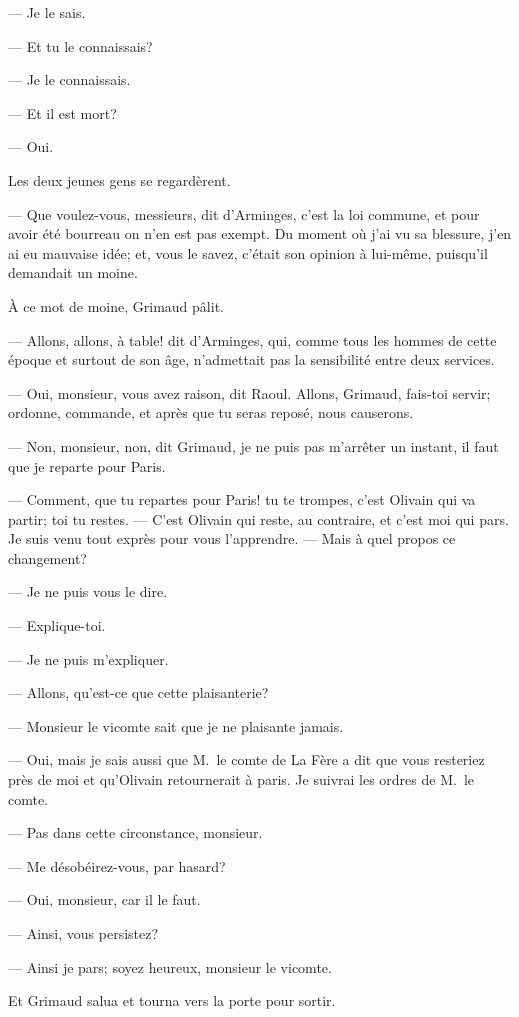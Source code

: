 — Je le sais.

— Et tu le connaissais?

— Je le connaissais.

— Et il est mort?

— Oui.

Les deux jeunes gens se regardèrent.

— Que voulez-vous, messieurs, dit d'Arminges, c'est la loi commune, et pour avoir été bourreau on n'en est pas exempt. Du moment où j'ai vu sa blessure, j'en ai eu mauvaise idée; et, vous le savez, c'était son opinion à lui-même, puisqu'il demandait un moine.

À ce mot de moine, Grimaud pâlit.

— Allons, allons, à table! dit d'Arminges, qui, comme tous les hommes de cette époque et surtout de son âge, n'admettait pas la sensibilité entre deux services.

— Oui, monsieur, vous avez raison, dit Raoul. Allons, Grimaud, fais-toi servir; ordonne, commande, et après que tu seras reposé, nous causerons.

— Non, monsieur, non, dit Grimaud, je ne puis pas m'arrêter un instant, il faut que je reparte pour Paris.

— Comment, que tu repartes pour Paris! tu te trompes, c'est Olivain qui va partir; toi tu restes.
— C'est Olivain qui reste, au contraire, et c'est moi qui pars. Je suis venu tout exprès pour vous l'apprendre.
— Mais à quel propos ce changement?

— Je ne puis vous le dire.

— Explique-toi.

— Je ne puis m'expliquer.

— Allons, qu'est-ce que cette plaisanterie?

— Monsieur le vicomte sait que je ne plaisante jamais.

— Oui, mais je sais aussi que M.~le comte de La Fère a dit que vous resteriez près de moi et qu'Olivain retournerait à paris. Je suivrai les ordres de M.~le comte.

— Pas dans cette circonstance, monsieur.

— Me désobéirez-vous, par hasard?

— Oui, monsieur, car il le faut.

— Ainsi, vous persistez?

— Ainsi je pars; soyez heureux, monsieur le vicomte.

Et Grimaud salua et tourna vers la porte pour sortir.

